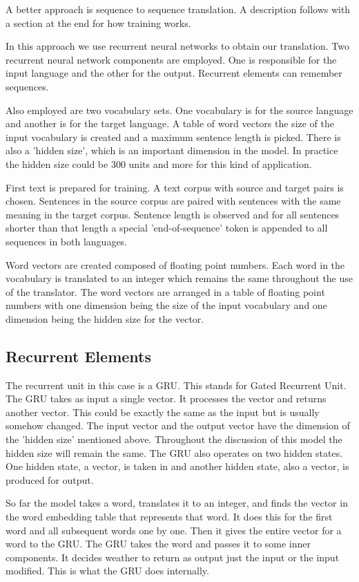 A better approach is sequence to sequence translation. A description follows with a section at the end for how training works.

In this approach we use recurrent neural networks to obtain our translation. Two recurrent neural network components are employed. One is responsible for the input language and the other for the output. Recurrent elements can remember sequences. 

Also employed are two vocabulary sets. One vocabulary is for the source language and another is for the target language. A table of word vectors the size of the input vocabulary is created and a maximum sentence length is picked. There is also a 'hidden size', which is an important dimension in the model. In practice the hidden size could be 300 units and more for this kind of application.

First text is prepared for training. A text corpus with source and target pairs is chosen. Sentences in the source corpus are paired with sentences with the same meaning in the target corpus. Sentence length is observed and for all sentences shorter than that length a special 'end-of-sequence' token is appended to all sequences in both languages.

Word vectors are created composed of floating point numbers. Each word in the vocabulary is translated to an integer which remains the same throughout the use of the translator. The word vectors are arranged in a table of floating point numbers with one dimension being the size of the input vocabulary and one dimension being the hidden size for the vector.

\subsection*{Recurrent Elements}
The recurrent unit in this case is a GRU. This stands for Gated Recurrent Unit. The GRU takes as input a single vector. It processes the vector and returns another vector. This could be
exactly the same as the input but is usually somehow changed. The input vector and the output vector have the
dimension of the 'hidden size' mentioned above. Throughout the discussion of this model the hidden size will remain the same. The GRU also operates on two hidden states. One hidden state, a vector, is taken in and another hidden state, also a vector, is produced for output.

So far the model takes a word, translates it to an integer, and finds the vector in the word embedding table that represents that word. It does this for the first word and all subsequent words one by one. Then it gives the entire vector for a word to the GRU. The GRU takes the word and passes it to some inner components. It decides weather to return as output just the input or the input modified. This is what the GRU does internally.

